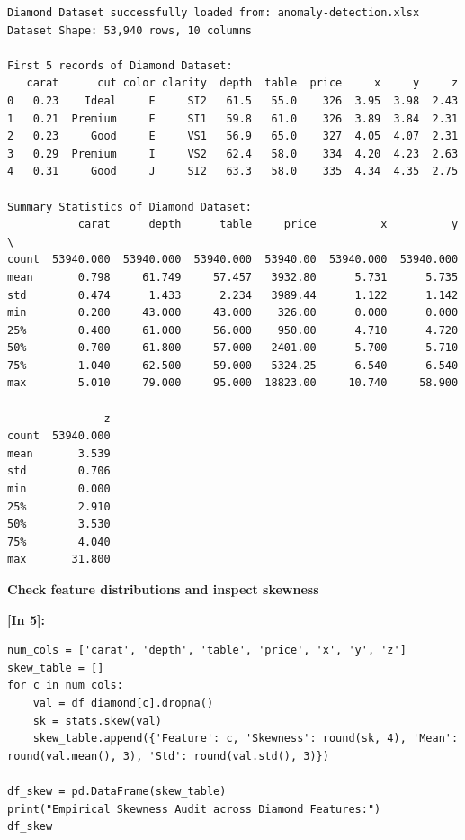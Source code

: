 \begin{lstlisting}[style=output]
Diamond Dataset successfully loaded from: anomaly-detection.xlsx
Dataset Shape: 53,940 rows, 10 columns

First 5 records of Diamond Dataset:
   carat      cut color clarity  depth  table  price     x     y     z
0   0.23    Ideal     E     SI2   61.5   55.0    326  3.95  3.98  2.43
1   0.21  Premium     E     SI1   59.8   61.0    326  3.89  3.84  2.31
2   0.23     Good     E     VS1   56.9   65.0    327  4.05  4.07  2.31
3   0.29  Premium     I     VS2   62.4   58.0    334  4.20  4.23  2.63
4   0.31     Good     J     SI2   63.3   58.0    335  4.34  4.35  2.75

Summary Statistics of Diamond Dataset:
           carat      depth      table     price          x          y  \
count  53940.000  53940.000  53940.000  53940.00  53940.000  53940.000   
mean       0.798     61.749     57.457   3932.80      5.731      5.735   
std        0.474      1.433      2.234   3989.44      1.122      1.142   
min        0.200     43.000     43.000    326.00      0.000      0.000   
25%        0.400     61.000     56.000    950.00      4.710      4.720   
50%        0.700     61.800     57.000   2401.00      5.700      5.710   
75%        1.040     62.500     59.000   5324.25      6.540      6.540   
max        5.010     79.000     95.000  18823.00     10.740     58.900   

               z  
count  53940.000  
mean       3.539  
std        0.706  
min        0.000  
25%        2.910  
50%        3.530  
75%        4.040  
max       31.800
\end{lstlisting}
\vspace{0.3em}
\begin{tcolorbox}[colback=gray!5!white,colframe=gray!50!black,boxrule=0.5pt,arc=2pt,left=5pt,right=5pt,top=2pt,bottom=2pt,unbreakable,before upper={\sloppy\raggedright}]
{\small\bfseries Check feature distributions and inspect skewness\par}
\end{tcolorbox}
\vspace{0.2em}
\vspace{0.4em}
\noindent\textbf{\small [In 5]:}
\begin{lstlisting}[style=pycode]
num_cols = ['carat', 'depth', 'table', 'price', 'x', 'y', 'z']
skew_table = []
for c in num_cols:
    val = df_diamond[c].dropna()
    sk = stats.skew(val)
    skew_table.append({'Feature': c, 'Skewness': round(sk, 4), 'Mean': round(val.mean(), 3), 'Std': round(val.std(), 3)})

df_skew = pd.DataFrame(skew_table)
print("Empirical Skewness Audit across Diamond Features:")
df_skew
\end{lstlisting}
